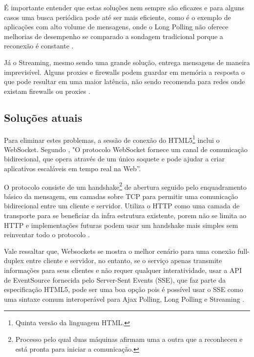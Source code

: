 É importante entender que estas soluções nem sempre são eficazes e para alguns casos uma busca periódica pode até ser mais eficiente, como é o exemplo de aplicações com alto volume de mensagens, onde o Long Polling não oferece melhorias de desempenho se comparado a sondagem tradicional porque a reconexão é constante \citep{Wang2013}.

Já o Streaming, mesmo sendo uma grande solução, entrega mensagens de maneira imprevisível. Alguns proxies e firewalls podem guardar em memória a resposta o que pode resultar em uma maior latência, não sendo recomenda para redes onde existam firewalls ou proxies \citep[p.~6]{Wang2013}.

\subsection{Soluções atuais}

Para eliminar estes problemas, a sessão de conexão do HTML5\footnote{Quinta versão da linguagem HTML.} inclui o WebSocket. Segundo \citet[p.~47, Tradução~nossa]{Pimentel2012}, "O protocolo WebSocket fornece um canal de comunicação bidirecional, que opera através de um único soquete e pode ajudar a criar aplicativos escaláveis em tempo real na Web”.

O protocolo consiste de um handshake\footnote{Processo pelo qual duas máquinas afirmam uma a outra que a reconheceu e está pronta para iniciar a comunicação.} de abertura seguido pelo enquadramento básico da mensagem, em camadas sobre TCP para permitir uma comunicação bidirecional entre um cliente e servidor. Utiliza o HTTP como uma camada de transporte para se beneficiar da infra estrutura existente, porem não se limita ao HTTP e implementações futuras podem usar um handshake mais simples sem reinventar todo o protocolo \citep{Saint-Andre2011}.

Vale ressaltar que, Websockets se mostra o melhor cenário para uma conexão full-duplex entre cliente e servidor, no entanto, se o serviço apenas transmite informações para seus clientes e não requer qualquer interatividade, usar a API de EventSource fornecida pelo Server-Sent Events (SSE), que faz parte da especificação HTML5, pode ser uma boa opção pois é possível usar o SSE como uma sintaxe comum interoperável para Ajax Polling, Long Polling e Streaming \citep[p.~10-11]{Wang2013}.